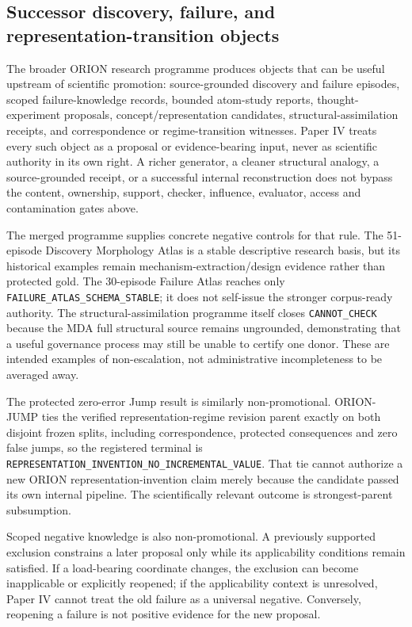 \subsection{Successor discovery, failure, and representation-transition objects}
\label{sec:p4-successor-discovery-failure}

The broader ORION research programme produces objects that can be useful upstream of scientific promotion: source-grounded discovery and failure episodes, scoped failure-knowledge records, bounded atom-study reports, thought-experiment proposals, concept/representation candidates, structural-assimilation receipts, and correspondence or regime-transition witnesses. Paper IV treats every such object as a proposal or evidence-bearing input, never as scientific authority in its own right. A richer generator, a cleaner structural analogy, a source-grounded receipt, or a successful internal reconstruction does not bypass the content, ownership, support, checker, influence, evaluator, access and contamination gates above.

The merged programme supplies concrete negative controls for that rule. The 51-episode Discovery Morphology Atlas is a stable descriptive research basis, but its historical examples remain mechanism-extraction/design evidence rather than protected gold. The 30-episode Failure Atlas reaches only \texttt{FAILURE\_ATLAS\_SCHEMA\_STABLE}; it does not self-issue the stronger corpus-ready authority. The structural-assimilation programme itself closes \texttt{CANNOT\_CHECK} because the MDA full structural source remains ungrounded, demonstrating that a useful governance process may still be unable to certify one donor. These are intended examples of non-escalation, not administrative incompleteness to be averaged away.

The protected zero-error Jump result is similarly non-promotional. ORION-JUMP ties the verified representation-regime revision parent exactly on both disjoint frozen splits, including correspondence, protected consequences and zero false jumps, so the registered terminal is \texttt{REPRESENTATION\_INVENTION\_NO\_INCREMENTAL\_VALUE}. That tie cannot authorize a new ORION representation-invention claim merely because the candidate passed its own internal pipeline. The scientifically relevant outcome is strongest-parent subsumption.

Scoped negative knowledge is also non-promotional. A previously supported exclusion constrains a later proposal only while its applicability conditions remain satisfied. If a load-bearing coordinate changes, the exclusion can become inapplicable or explicitly reopened; if the applicability context is unresolved, Paper IV cannot treat the old failure as a universal negative. Conversely, reopening a failure is not positive evidence for the new proposal.


